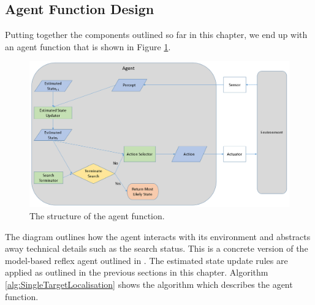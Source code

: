 \subsection{Agent Function Design}\label{subsec:AgentFNArch}
Putting together the components outlined so far in this chapter, we end up with an agent function that is shown in Figure \ref{fig:BasicAgentArchitecture}. 

\begin{figure}[H]
    \centering
    \includegraphics[width = 0.88\linewidth]{Chapters/MultiAgentTargetDetection/Figs/AgentFnArchitecture/BasicAgentFunctionNoCommunication.PNG}
    \caption{The structure of the agent function.}
    \label{fig:BasicAgentArchitecture}
\end{figure}


The diagram outlines how the agent interacts with its environment and abstracts away technical details such as the search status. This is a concrete version of the model-based reflex agent outlined in \cite[p.~51]{AIAMA}. The estimated state update rules are applied as outlined in the previous sections in this chapter. Algorithm \ref{alg:SingleTargetLocalisation} shows the algorithm which describes the agent function.



